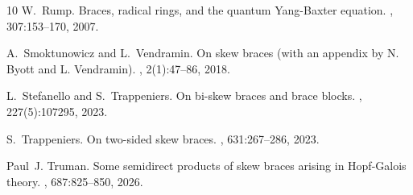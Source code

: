 \documentclass[12pt,a4paper, reqno]{amsart}
\theoremstyle{definition}
\begin{document}
\begin{thebibliography}{10}
W.~Rump.
\newblock Braces, radical rings, and the quantum {Y}ang-{B}axter equation.
, 307:153--170, 2007.

A.~Smoktunowicz and L.~Vendramin.
\newblock On skew braces (with an appendix by {N}. {B}yott and {L}.
  {V}endramin).
, 2(1):47--86, 2018.

L.~Stefanello and S.~Trappeniers.
\newblock On bi-skew braces and brace blocks.
, 227(5):107295, 2023.

S.~Trappeniers.
\newblock On two-sided skew braces.
, 631:267--286, 2023.

Paul~J. Truman.
\newblock Some semidirect products of skew braces arising in {H}opf-{G}alois
  theory.
, 687:825--850, 2026.

\end{thebibliography}
\end{document}
